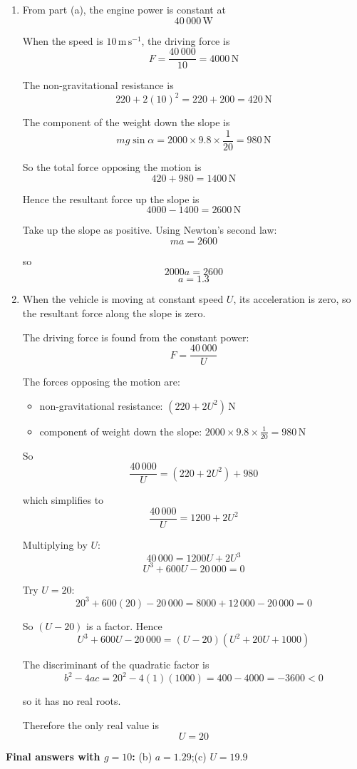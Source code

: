 \documentclass[leqno]{article}
\begin{document}
\begin{enumerate}[
  label=\textbf{\arabic*.},
  leftmargin=*,
  topsep=0pt,
  partopsep=0pt,
  parsep=0pt
]
\begin{djsSolution}
\begin{enumerate}[label=\textbf{(\alph*)}, start=1]
  \item From part (a), the engine power is constant at
\[
40\,000\,\mathrm{W}
\]

When the speed is $10\,\mathrm{m\,s^{-1}}$, the driving force is
\[
F=\frac{40\,000}{10}=4000\,\mathrm{N}
\]

The non-gravitational resistance is
\[
220+2(10)^2=220+200=420\,\mathrm{N}
\]

The component of the weight down the slope is
\[
mg\sin\alpha = 2000\times 9.8\times \frac{1}{20}=980\,\mathrm{N}
\]

So the total force opposing the motion is
\[
420+980=1400\,\mathrm{N}
\]

Hence the resultant force up the slope is
\[
4000-1400=2600\,\mathrm{N}
\]

Take up the slope as positive. Using Newton's second law:
\[
ma=2600
\]

so
\[
2000a=2600
\]
\[
a=1.3
\]

  \item When the vehicle is moving at constant speed $U$, its acceleration is zero, so the resultant force along the slope is zero.

The driving force is found from the constant power:
\[
F=\frac{40\,000}{U}
\]

The forces opposing the motion are:
\begin{itemize}
  \item non-gravitational resistance: $\left(220+2U^2\right)\,\mathrm{N}$
  \item component of weight down the slope: $2000\times 9.8\times \frac{1}{20}=980\,\mathrm{N}$
\end{itemize}

So
\[
\frac{40\,000}{U}=(220+2U^2)+980
\]

which simplifies to
\[
\frac{40\,000}{U}=1200+2U^2
\]

Multiplying by $U$:
\[
40\,000=1200U+2U^3
\]
\[
U^3+600U-20\,000=0
\]

Try $U=20$:
\[
20^3+600(20)-20\,000=8000+12\,000-20\,000=0
\]

So $(U-20)$ is a factor. Hence
\[
U^3+600U-20\,000=(U-20)(U^2+20U+1000)
\]

The discriminant of the quadratic factor is
\[
b^2-4ac=20^2-4(1)(1000)=400-4000=-3600<0
\]

so it has no real roots.

Therefore the only real value is
\[
U=20
\]
\end{enumerate}
\par\medskip\noindent\textbf{Final answers with \(g = 10\):} (b) \(a = 1.29\);\quad (c) \(U = 19.9\)
\end{djsSolution}


\end{enumerate}
\end{document}

